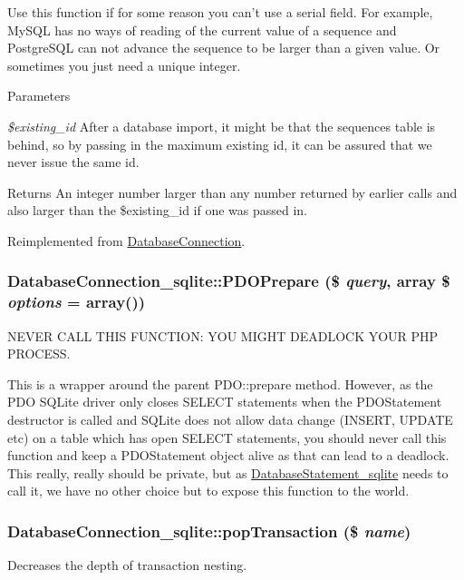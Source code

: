 Use this function if for some reason you can't use a serial field. For example, MySQL has no ways of reading of the current value of a sequence and PostgreSQL can not advance the sequence to be larger than a given value. Or sometimes you just need a unique integer.


\begin{DoxyParams}{Parameters}
\item[{\em \$existing\_\-id}]After a database import, it might be that the sequences table is behind, so by passing in the maximum existing id, it can be assured that we never issue the same id.\end{DoxyParams}
\begin{DoxyReturn}{Returns}
An integer number larger than any number returned by earlier calls and also larger than the \$existing\_\-id if one was passed in. 
\end{DoxyReturn}


Reimplemented from \hyperlink{classDatabaseConnection_a173e333ef1b61541cf37125468a37231}{DatabaseConnection}.\hypertarget{classDatabaseConnection__sqlite_a8e377488ebb6c76e61590ca3f5d7245c}{
\subsubsection[{PDOPrepare}]{\setlength{\rightskip}{0pt plus 5cm}DatabaseConnection\_\-sqlite::PDOPrepare (\$ {\em query}, \/  array \$ {\em options} = {\ttfamily array()})}}
\label{classDatabaseConnection__sqlite_a8e377488ebb6c76e61590ca3f5d7245c}
NEVER CALL THIS FUNCTION: YOU MIGHT DEADLOCK YOUR PHP PROCESS.

This is a wrapper around the parent PDO::prepare method. However, as the PDO SQLite driver only closes SELECT statements when the PDOStatement destructor is called and SQLite does not allow data change (INSERT, UPDATE etc) on a table which has open SELECT statements, you should never call this function and keep a PDOStatement object alive as that can lead to a deadlock. This really, really should be private, but as \hyperlink{classDatabaseStatement__sqlite}{DatabaseStatement\_\-sqlite} needs to call it, we have no other choice but to expose this function to the world. \hypertarget{classDatabaseConnection__sqlite_a92aff36a5e22c5f21258a6a2333121b4}{
\subsubsection[{popTransaction}]{\setlength{\rightskip}{0pt plus 5cm}DatabaseConnection\_\-sqlite::popTransaction (\$ {\em name})}}
\label{classDatabaseConnection__sqlite_a92aff36a5e22c5f21258a6a2333121b4}
Decreases the depth of transaction nesting.


